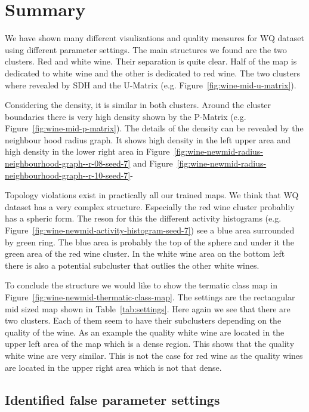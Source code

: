 \documentclass{acm_proc_article-sp}
\begin{document}
\section{Summary}

We have shown many different visulizations and quality measures for WQ dataset using different
parameter settings. The main structures
we found are the two clusters. Red and white wine. Their separation is quite clear. Half of 
the map is dedicated to white wine and the other is dedicated to red wine.
The two clusters where revealed by SDH and the U-Matrix (e.g. Figure~\ref{fig:wine-mid-u-matrix}).

Considering the density, it is similar in both clusters. Around the cluster boundaries there is
very high density shown by the P-Matrix (e.g. Figure~\ref{fig:wine-mid-p-matrix}). 
The details of the density can be revealed by the neighbour hood radius graph.
It shows high density in the left upper area and high density in the lower right area in
Figure~\ref{fig:wine-newmid-radius-neighbourhood-graph--r-08-seed-7} and Figure~\ref{fig:wine-newmid-radius-neighbourhood-graph--r-10-seed-7}-

Topology violations exist in practically all our trained maps. We think that WQ dataset has
a very complex structure. Especially the red wine cluster probabliy has a spheric form.
The reson for this the different activity histograms (e.g. Figure~\ref{fig:wine-newmid-activity-histogram-seed-7}) see a blue area surrounded by green ring. The blue area is probably the top of the sphere and
under it the green area of the red wine cluster. In the white wine area on the bottom left
there is also a potential subcluster that outlies the other white wines.

To conclude the structure we would like to show the termatic class map in Figure~\ref{fig:wine-newmid-thermatic-class-map}. The settings are the rectangular mid sized map shown in Table~\ref{tab:settings}.
Here again we see that there are two clusters. Each of them seem to have their subclusters depending
on the quality of the wine. As an example the quality white wine are located in the upper left area of
the map which is a dense region. This shows that the quality white wine are very similar.
This is not the case for red wine as the quality wines are located in the upper right area which is
not that dense.

\subsection{Identified false parameter settings}
\end{document}
